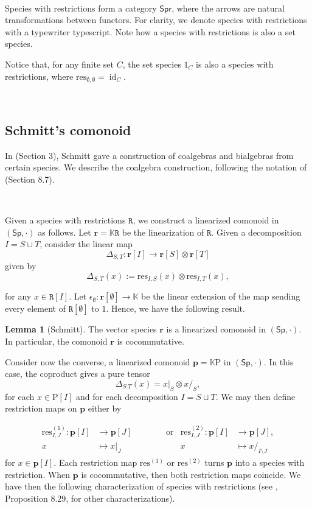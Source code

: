 \documentclass[12pt, reqno]{amsart}
\theoremstyle{definition}
\newtheorem{lm}[thm]{Lemma}
\DeclareMathOperator{\id}{id}
\newcommand{\Ss}{\mathsf{Sp}} %
\newcommand{\Spr}{\mathsf{Spr}} %
\newcommand{\rP}{\mathrm{P}}
\newcommand{\prR}{\mathtt{R}}
\newcommand{\tp}{\mathbf{p}}
\newcommand{\trr}{\mathbf{r}}
\begin{document}

\

Species with restrictions form a category $\Spr$, where the arrows are natural transformations between functors.
For clarity, we denote species with restrictions with a typewriter typescript.
Note how a species with restrictions is also a set species.

Notice that, for any finite set $C$, the set species $\mathrm{1}_C$ is also a species with restrictions, where $\text{res}_{\emptyset, \emptyset} = \id_C$.

\

\subsection{Schmitt's comonoid}
In \cite{Schmitt1993} (Section 3), Schmitt gave a construction of coalgebras and bialgebras from certain species. We describe the coalgebra construction, following the notation of \cite{AM2010} (Section 8.7).

\

Given a species with restrictions $\prR$, we construct a linearized comonoid in $(\Ss, \cdot)$ as follows. Let $\trr=\mathbb{K}\prR$ be the linearization of $\prR$. Given a decomposition $I=S \sqcup T$, consider the linear map
\[
\Delta_{S,T}: \trr[I]\to \trr[S] \otimes \trr[T]
\]
given by
\begin{equation}\label{CoprodRestr}
\Delta_{S,T}(x):=\text{res}_{I,S}(x)\otimes \text{res}_{I,T}(x),
\end{equation}

for any $x \in \prR[I]$. Let $\epsilon_\emptyset: \trr[\emptyset]\to \mathbb{K}$ be the linear extension of the map sending every element of $\prR[\emptyset]$ to $1$. Hence, we have the following result.

\begin{lm}[Schmitt]
The vector species $\trr$ is a linearized comonoid in $(\Ss, \cdot)$. In particular, the comonoid $\trr$ is cocommutative.
\end{lm}


Consider now the converse, a linearized comonoid $\tp=\mathbb{K}\rP$ in $(\Ss, \cdot)$. 
In this case, the coproduct gives a pure tensor
\[\Delta_{S.T}(x)=x|_S \otimes x/_S,\]
for each $x \in \rP[I]$ and for each decomposition $I = S \sqcup T$. We may then define restriction maps on $\tp$ either by

\begin{align*}
\text{res}^{(1)}_{I,J}: \tp[I] &\to \tp[J] \qquad \qquad  \text{or}  &\text{res}^{(2)}_{I,J}: \tp[I] &\to \tp[J],\\
x&\mapsto x|_J \qquad &x&\mapsto x/_{I\setminus J}
\end{align*} 
for $x \in \tp[I]$. Each restriction map $\text{res}^{(1)}$ or $\text{res}^{(2)}$ turns $\tp$ into a species with restriction. When $\tp$ is cocommutative, then both restriction maps coincide. We have then the following characterization of species with restrictions (see \cite{AM2010}, Proposition 8.29, for other characterizations).
\end{document}
